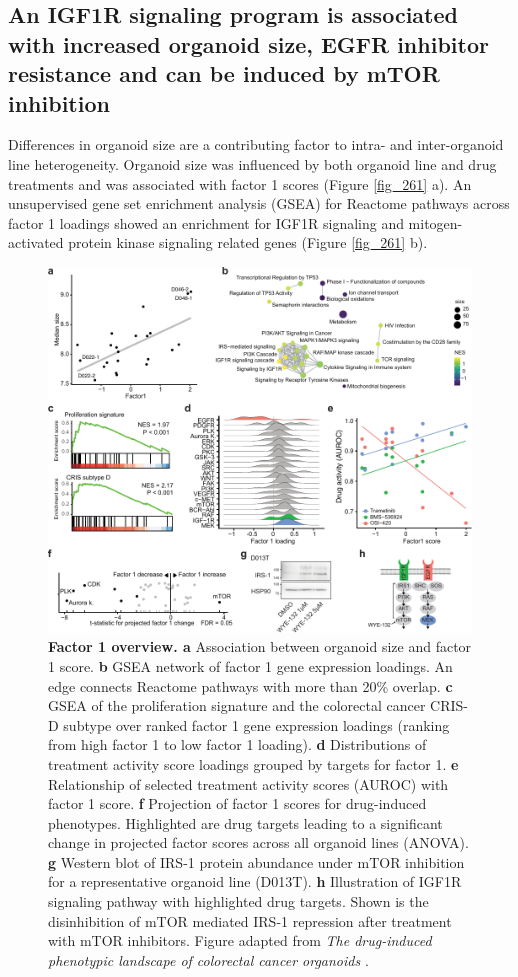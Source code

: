 \begin{flushleft}
\newpage
\section{An IGF1R signaling program is associated with increased organoid size, EGFR inhibitor resistance and can be induced by mTOR inhibition}

Differences in organoid size are a contributing factor to intra- and inter-organoid line heterogeneity. Organoid size was influenced by both organoid line and drug treatments and was associated with factor 1 scores (Figure \ref{fig_261} a). An unsupervised gene set enrichment analysis (GSEA) for Reactome pathways across factor 1 loadings showed an enrichment for IGF1R signaling and mitogen-activated protein kinase signaling related genes (Figure \ref{fig_261} b). 

\begin{figure}[h!]
\centering
\includegraphics[width=\textwidth,
                height=\textheight,
                keepaspectratio]{figures/promise/pdf/fig_6_1.pdf}
\caption{\textbf{Factor 1 overview. a} Association between organoid size and factor 1 score. \textbf{b} GSEA network of factor 1 gene expression loadings. An edge connects Reactome pathways with more than 20\% overlap. \textbf{c} GSEA of the proliferation signature and the colorectal cancer CRIS-D subtype over ranked factor 1 gene expression loadings (ranking from high factor 1 to low factor 1 loading). \textbf{d} Distributions of treatment activity score loadings grouped by targets for factor 1. \textbf{e} Relationship of selected treatment activity scores (AUROC) with factor 1 score. \textbf{f} Projection of factor 1 scores for drug-induced phenotypes. Highlighted are drug targets leading to a significant change in projected factor scores across all organoid lines (ANOVA). \textbf{g} Western blot of IRS-1 protein abundance under mTOR inhibition for a representative organoid line (D013T). \textbf{h} Illustration of IGF1R signaling pathway with highlighted drug targets. Shown is the disinhibition of mTOR mediated IRS-1 repression after treatment with mTOR inhibitors. Figure adapted from \textit{The drug-induced phenotypic landscape of colorectal cancer organoids} \cite{Betge2022-kr}.}

\end{figure}
\end{flushleft}
